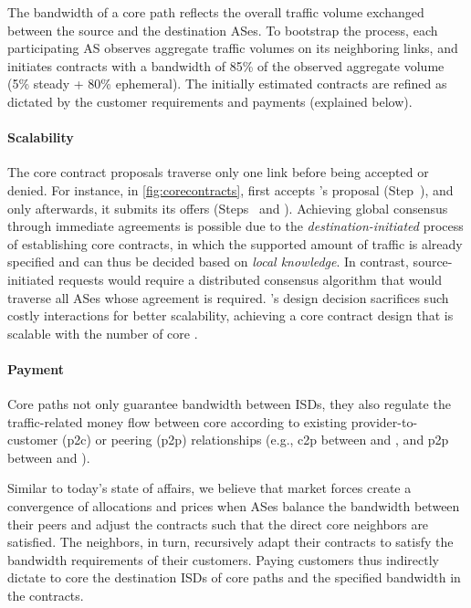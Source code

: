 The bandwidth of a core path reflects the overall traffic volume exchanged
between the source and the destination ASes. To bootstrap the process, each
participating AS observes aggregate traffic volumes on its neighboring links,
and initiates contracts with a bandwidth of 85\% of the observed aggregate
volume (5\% steady + 80\% ephemeral). The initially estimated contracts are
refined as dictated by the customer requirements and payments (explained below).



\paragraph{Scalability} The core contract proposals traverse only one link
before being accepted or denied. For instance, in \autoref{fig:corecontracts},
 first accepts 's proposal (Step~), and only
afterwards, it submits its offers (Steps~ and ). Achieving
global consensus through immediate agreements is possible due to the
\textit{destination-initiated} process of establishing core contracts, in which
the supported amount of traffic is already specified and can thus be decided
based on \textit{local knowledge}. In contrast, source-initiated requests would
require a distributed consensus algorithm that would traverse all ASes whose
agreement is required. \name's design decision sacrifices such costly
interactions for better scalability, achieving a core contract design that is
scalable with the number of core \ADs.


\paragraph{Payment} Core paths not only guarantee bandwidth between
ISDs, they also regulate the traffic-related money flow between core
\ADs according to existing provider-to-customer (p2c) or peering (p2p)
relationships (e.g., c2p between  and , and p2p
between  and ).

Similar to today's state of affairs, we believe that market forces create a
convergence of allocations and prices when ASes balance the bandwidth between
their peers and adjust the contracts such that the direct core \AD neighbors
are satisfied. The neighbors, in turn, recursively adapt their contracts to
satisfy the bandwidth requirements of their customers. Paying customers thus
indirectly dictate to core \ADs the destination ISDs of core paths and the
specified bandwidth in the contracts.


